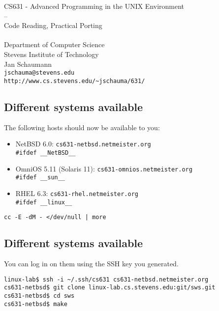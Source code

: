 \documentclass[xga]{xdvislides}
\begin{document}
\setfontphv

\lhead{\slidetitle}
\cfoot{\relax}
\rfoot{\Gray{\today}}

\vspace*{\fill}
\begin{center}
	\Hugesize
		CS631 - Advanced Programming in the UNIX Environment\\
		-- \\
		Code Reading, Practical Porting\\
	\hspace*{5mm}\blueline\\ [1em]
	\Normalsize
		Department of Computer Science\\
		Stevens Institute of Technology\\
		Jan Schaumann\\
		\verb+jschauma@stevens.edu+\\
		\verb+http://www.cs.stevens.edu/~jschauma/631/+
\end{center}
\vspace*{\fill}

\subsection{Different systems available}
The following hosts should now be available to you:

\begin{itemize}
	\item NetBSD 6.0: {\tt cs631-netbsd.netmeister.org} \\
		{\tt \#ifdef \_\_NetBSD\_\_}
	\item OmniOS 5.11 (Solaris 11): {\tt cs631-omnios.netmeister.org}
\\
		{\tt \#ifdef \_\_sun\_\_}
	\item RHEL 6.3: {\tt cs631-rhel.netmeister.org} \\
		{\tt \#ifdef \_\_linux\_\_}
\end{itemize}
\vspace{.5in}
{\tt cc -E -dM - </dev/null | more}

\subsection{Different systems available}
You can log in on them using the SSH key you generated.

\begin{verbatim}
linux-lab$ ssh -i ~/.ssh/cs631 cs631-netbsd.netmeister.org
cs631-netbsd$ git clone linux-lab.cs.stevens.edu:git/sws.git
cs631-netbsd$ cd sws
cs631-netbsd$ make
\end{verbatim}
\end{document}
